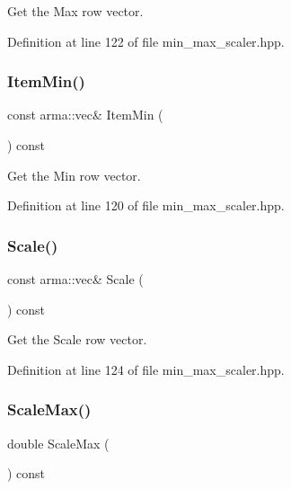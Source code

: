 Get the Max row vector. 



Definition at line 122 of file min\+\_\+max\+\_\+scaler.\+hpp.

\mbox{\label{classmlpack_1_1data_1_1MinMaxScaler_ae9ae591f227874f238c38d4cf070c6c8}} 
\subsubsection{Item\+Min()}
{\footnotesize\ttfamily const arma\+::vec\& Item\+Min (\begin{DoxyParamCaption}{ }\end{DoxyParamCaption}) const\hspace{0.3cm}{\ttfamily [inline]}}



Get the Min row vector. 



Definition at line 120 of file min\+\_\+max\+\_\+scaler.\+hpp.

\mbox{\label{classmlpack_1_1data_1_1MinMaxScaler_a5adcafebd2c229793e57b7268c90a0fe}} 
\subsubsection{Scale()}
{\footnotesize\ttfamily const arma\+::vec\& Scale (\begin{DoxyParamCaption}{ }\end{DoxyParamCaption}) const\hspace{0.3cm}{\ttfamily [inline]}}



Get the Scale row vector. 



Definition at line 124 of file min\+\_\+max\+\_\+scaler.\+hpp.

\mbox{\label{classmlpack_1_1data_1_1MinMaxScaler_a841ab6e52291099af1ea0d7f50b31f87}} 
\subsubsection{Scale\+Max()}
{\footnotesize\ttfamily double Scale\+Max (\begin{DoxyParamCaption}{ }\end{DoxyParamCaption}) const\hspace{0.3cm}{\ttfamily [inline]}}



